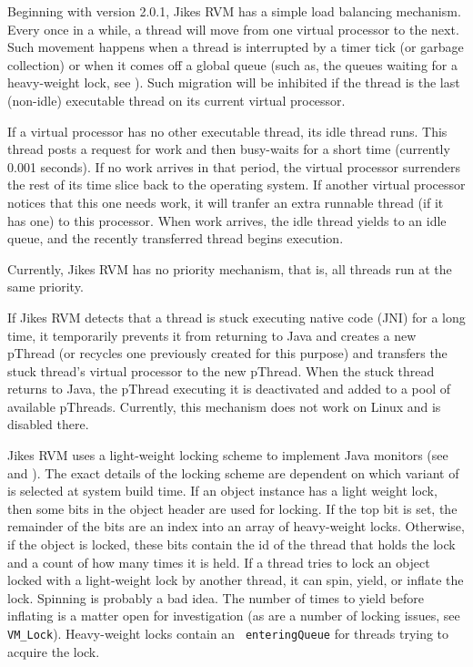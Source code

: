 Beginning with version 2.0.1, Jikes RVM has a simple load balancing
mechanism. Every once in a while, a thread will move from one virtual
processor to the next.  Such movement happens when a thread is
interrupted by a timer tick (or garbage collection) or when it comes
off a global queue (such as, the queues waiting for a heavy-weight
lock, see ).  Such migration will be
inhibited if the thread is the last (non-idle) executable thread on
its current virtual processor.  

If a virtual processor has no other executable thread, its idle thread
runs.  This thread posts a request for work and then busy-waits for a
short time (currently 0.001 seconds).  If no work arrives in that
period, the virtual processor surrenders the rest of its time slice
back to the operating system.  If another virtual processor notices
that this one needs work, it will tranfer an extra runnable thread (if
it has one) to this processor.  When work arrives, the idle thread
yields to an idle queue, and the recently transferred thread begins
execution.

Currently, Jikes RVM has no priority mechanism, that is, all threads run at
the same priority.

If Jikes RVM detects that a thread is stuck executing native code (JNI)
for a long time, it temporarily prevents it from returning to Java and
creates a new pThread (or recycles one previously created for this 
purpose) and transfers the stuck thread's virtual processor to the
new pThread.  When the stuck thread returns to Java, the pThread
executing it is deactivated and added to a pool of available pThreads.
Currently, this mechanism does not work on Linux and is disabled there.

Jikes RVM uses a light-weight locking scheme to implement Java monitors (see
 and 
). The exact details of the
locking scheme are dependent on which variant of 
 is selected at
system build time.  If an object instance has a light weight lock,
then some bits in the object header are used for locking.  
If the top bit is set, the remainder of the bits 
are an index into an array of heavy-weight locks.
Otherwise, if the object is locked, these bits contain the id of the
thread that holds the lock and a count of how many times it is held.
If a thread tries to lock an object locked with a light-weight lock by
another thread, it can spin, yield, or inflate the lock.  Spinning is
probably a bad idea.  The number of times to yield before inflating is
a matter open for investigation (as are a number of locking
issues, see {\tt VM\_Lock}).  Heavy-weight locks contain an {\tt
enteringQueue} for threads trying to acquire the lock.

